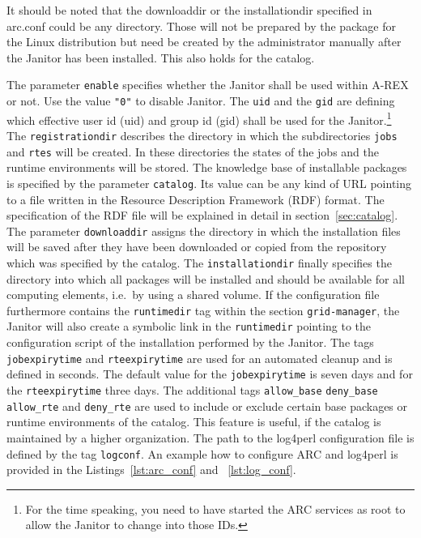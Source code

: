 It should be noted that the downloaddir or the installationdir specified
in arc.conf could be any directory. Those will not be prepared by the
package for the Linux distribution but need be created by the administrator
manually after the Janitor has been installed. This also holds for the
catalog.

The parameter \texttt{enable} specifies whether the Janitor shall be used
within A-REX or not. Use the value \texttt{"0"} to disable Janitor. The
\texttt{uid} and the \texttt{gid} are defining which effective user id
(uid) and group id (gid) shall be used for the Janitor.\footnote{For
the time speaking, you need to have started the ARC services as root to
allow the Janitor to change into those IDs.} The \texttt{registrationdir}
describes the directory in which the subdirectories \texttt{jobs} and
\texttt{rtes} will be created.  In these directories the states of the
jobs and the runtime environments will be stored.  The knowledge base
of installable packages is specified by the parameter \texttt{catalog}.
Its value can be any kind of URL pointing to a file written in the
Resource Description Framework (RDF) format.  The specification of the
RDF file will be explained in detail in section~\ref{sec:catalog}.
The parameter \texttt{downloaddir} assigns the directory in which
the installation files will be saved after they have been downloaded
or copied from the repository which was specified by the catalog. The
\texttt{installationdir} finally specifies the directory into which all
packages will be installed and should be available for all computing
elements, i.e.\ by using a shared volume.  If the configuration file
furthermore contains the \texttt{runtimedir} tag within the section
\texttt{grid-manager}, the Janitor will also create a symbolic link
in the \texttt{runtimedir} pointing to the configuration script of the
installation performed by the Janitor.  The tags \texttt{jobexpirytime}
and \texttt{rteexpirytime} are used for an automated cleanup and is
defined in seconds.  The default value for the \texttt{jobexpirytime} is
seven days and for the \texttt{rteexpirytime} three days.  The additional
tags \texttt{allow\_base} \texttt{deny\_base} \texttt{allow\_rte} and
\texttt{deny\_rte} are used to include or exclude certain base packages
or runtime environments of the catalog. This feature is useful, if
the catalog is maintained by a higher organization.  The path to the
log4perl configuration file is defined by the tag \texttt{logconf}.
An example how to configure ARC and log4perl is provided in the
Listings~\ref{lst:arc_conf} and ~\ref{lst:log_conf}.

